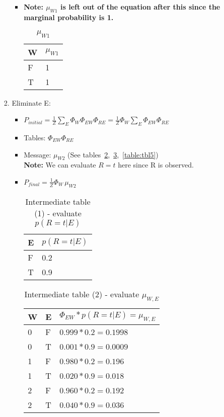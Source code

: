 \documentclass{article}
\begin{document}
\begin{enumerate}[label=(\alph*)]
\begin{enumerate}[label=\roman*.]
\begin{enumerate}[label=\alph*.]
\begin{itemize}
\item \textbf{Note:  $\mu_{W1}$ is left out of the equation after this since the marginal probability is 1.}

\begin{table}[h]
\centering
\caption{$\mu_{W1}$}
\label{table:tbl2}
\begin{tabular}{|l|l|}
\hline
 W & $\mu_{W1}$   \\
\hline \hline
 F & 1  \\
 T & 1  \\
\hline
\end{tabular}
\end{table}

\end{itemize}

\item Eliminate E:

\begin{itemize}

\item $P_{initial}=\frac{1}{Z}\sum_{E}\Phi_{W}\Phi_{EW}\Phi_{RE} = \frac{1}{Z}\Phi_{W}\sum_{E}\Phi_{EW}\Phi_{RE}$

\item Tables: $\Phi_{EW}\Phi_{RE}$

\item Message: $\mu_{W2}$ (See tables~\ref{table:tbl3},~\ref{table:tbl4},~\ref{table:tbl5}) \\
\textbf{Note:} We can evaluate $R=t$ here since R is observed.

\item  $P_{final}=\frac{1}{Z}\Phi_{W}\,\mu_{W2}$

\begin{table}[h]
\centering
\caption{Intermediate table (1) - evaluate $p(R=t|E)$}
\label{table:tbl3}
\begin{tabular}{|l|l|}
\hline
 E & $p(R=t|E)$   \\
\hline \hline
 F & 0.2  \\
 T & 0.9  \\
\hline
\end{tabular}
\end{table}

\begin{table}[h]
\centering
\caption{Intermediate table (2) - evaluate $\mu_{W,E}$}
\label{table:tbl4}
\begin{tabular}{|l|l|l|}
\hline
 W &E & $\Phi_{EW}*p(R=t|E)=\mu_{W,E}$   \\
\hline \hline
0 & F & $0.999*0.2=0.1998$ \\
0 & T & $0.001*0.9=0.0009$ \\
1 & F & $0.980*0.2=0.196$ \\
1 & T & $0.020*0.9=0.018$ \\
2 & F & $0.960*0.2=0.192$ \\
2 & T & $0.040*0.9=0.036$ \\
\hline
\end{tabular}
\end{table}


\end{itemize}
\end{enumerate}
\end{enumerate}
\end{enumerate}
\end{document}
